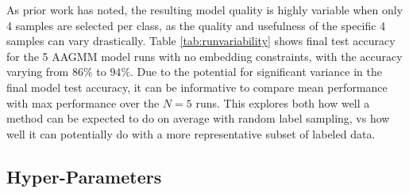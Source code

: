 \documentclass[10pt,twocolumn,letterpaper]{article}
\begin{document}
As prior work \cite{sohn2020fixmatch} has noted, the resulting model quality is highly variable when only 4 samples are selected per class, as the quality and usefulness of the specific 4 samples can vary drastically. 
Table \ref{tab:runvariability} shows final test accuracy for the 5 AAGMM model runs with no embedding constraints, with the accuracy varying from $86\%$ to $94\%$.
Due to the potential for significant variance in the final model test accuracy, it can be informative to compare mean performance with max performance over the $N=5$ runs.
This explores both how well a method can be expected to do on average with random label sampling, vs how well it can potentially do with a more representative subset of labeled data.

\subsection{Hyper-Parameters}
\label{hyperparams}
\end{document}

